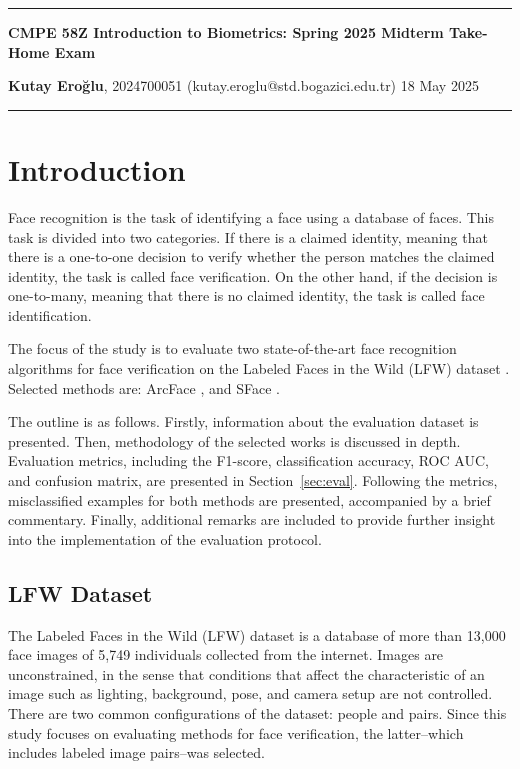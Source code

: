 \documentclass[10pt,a4paper,twoside]{article}
\begin{document}
\begin{center}

\hrule
\vspace{.4cm}
{\bf {\Huge CMPE 58Z Introduction to Biometrics: 
Spring 2025 Midterm Take-Home Exam}}
\vspace{.2cm}
\end{center}
{\bf Kutay Eroğlu}, 2024700051 (kutay.eroglu@std.bogazici.edu.tr)  
\hspace{\fill} 18 May 2025 \\
\hrule

\section{Introduction}

Face recognition is the task of identifying a face using a database of faces. This task is divided into two categories. If there is a claimed identity, meaning that there is a one-to-one decision to verify whether the person matches the claimed identity, the task is called face verification. On the other hand, if the decision is one-to-many, meaning that there is no claimed identity, the task is called face identification.

The focus of the study is to evaluate two state-of-the-art face recognition algorithms for face verification on the Labeled Faces in the Wild (LFW) dataset \cite{lfw_dataset}. Selected methods are: ArcFace \cite{arcface}, and SFace \cite{sface}. 

The outline is as follows. Firstly, information about the evaluation dataset is presented. Then, methodology of the selected works is discussed in depth. Evaluation metrics, including the F1-score, classification accuracy, ROC AUC, and confusion matrix, are presented in Section~\ref{sec:eval}. Following the metrics, misclassified examples for both methods are presented, accompanied by a brief commentary. Finally, additional remarks are included to provide further insight into the implementation of the evaluation protocol.

\subsection{LFW Dataset}

The Labeled Faces in the Wild (LFW) dataset \cite{lfw_dataset} is a database of more than 13,000 face images of 5,749 individuals collected from the internet. Images are unconstrained, in the sense that conditions that affect the characteristic of an image such as lighting, background, pose, and camera setup are not controlled. There are two common configurations of the dataset: people and pairs. Since this study focuses on evaluating methods for face verification, the latter--which includes labeled image pairs--was selected.
\end{document}
